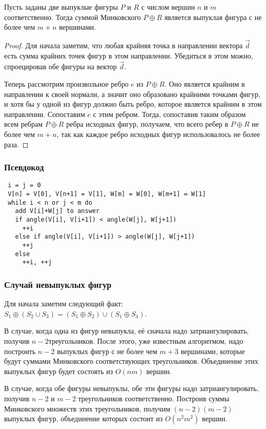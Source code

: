 \begin{theorem}
    Пусть заданы две выпуклые фигуры $P$ и $R$ с числом вершин $n$ и $m$ соответственно.
    Тогда суммой Минковского $P \oplus R$ является выпуклая фигура с не более чем $m+n$ вершинами.
\end{theorem}
\begin{proof}
    Для начала заметим, что любая крайняя точка в направлении вектора $\vec{d}$ есть сумма крайних точек фигур в этом направлении.
    Убедиться в этом можно, спроецировав обе фигуры на вектор $\vec{d}$.

    Теперь рассмотрим произвольное ребро $e$ из $P \oplus R$. 
    Оно является крайним в направлении к своей нормали, а значит оно образовано крайними точками фигур, и хотя бы у одной из фигур должно быть ребро, которое является крайним в этом направлении.
    Сопоставим $e$ с этим ребром.
    Тогда, сопоставив таким образом всем ребрам $P \oplus R$ ребра исходных фигур, получаем, что всего ребер в $P \oplus R$ не более чем $m+n$, так как каждое ребро исходных фигур использовалось не более раза. 
\end{proof}

\subsubsection{Псевдокод}

\begin{verbatim}
 i = j = 0
 V[n] = V[0], V[n+1] = V[1], W[m] = W[0], W[m+1] = W[1]
 while i < n or j < m do
   add V[i]+W[j] to answer
   if angle(V[i], V[i+1]) < angle(W[j], W[j+1])
     ++i
   else if angle(V[i], V[i+1]) > angle(W[j], W[j+1])
     ++j
   else
     ++i, ++j
\end{verbatim}

\subsubsection{Случай невыпуклых фигур}

Для начала заметим следующий факт: $S_1 \oplus (S_2 \cup S_3)=(S_1 \oplus S_2) \cup (S_1 \oplus S_3)$.

В случае, когда одна из фигур невыпукла, её сначала надо затриангулировать, получив $n-2$треугольников.
После этого, уже известным алгоритмом, надо построить $n-2$ выпуклых фигур с не более чем $m+3$ вершинами, которые будут суммами Минковского соответствующих треугольников.
Объединение этих выпуклых фигур будет состоять из $O(nm)$ вершин.

В случае, когда обе фигуры невыпуклы, обе эти фигуры надо затриангулировать, получив $n-2$ и $m-2$ треугольников соответственно.
Построив суммы Минковского множеств этих треугольников, получим $(n-2)(m-2)$ выпуклых фигур, объединение которых состоит из $O(n^2m^2)$ вершин. 
